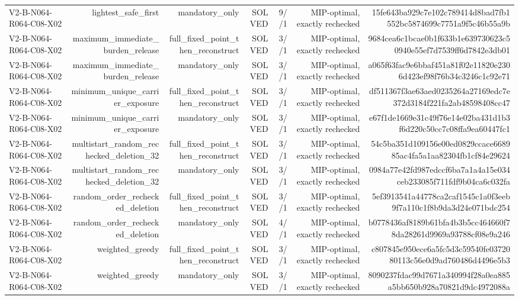 {\begin{longtable}{lrrrrrr}
V2-B-N064-R064-C08-X02 & lightest\_safe\_first & mandatory\_only & SOLVED & 9//1 & MIP-optimal, exactly rechecked & 15fe643ba929c7e102c789414d8bad7fb1552bc5874699c7751a9f5c46b55a9b \\
V2-B-N064-R064-C08-X02 & maximum\_immediate\_burden\_release & full\_fixed\_point\_then\_reconstruct & SOLVED & 3//1 & MIP-optimal, exactly rechecked & 9684cea6c1bcae0b1f633b1e639730623c50940e55ef7d7539ff6d7842e3db01 \\
V2-B-N064-R064-C08-X02 & maximum\_immediate\_burden\_release & mandatory\_only & SOLVED & 3//1 & MIP-optimal, exactly rechecked & a065f63fac9e6bbaf451a81f02e11820e2306d423ef98f76b34c3246c1c92e71 \\
V2-B-N064-R064-C08-X02 & minimum\_unique\_carrier\_exposure & full\_fixed\_point\_then\_reconstruct & SOLVED & 3//1 & MIP-optimal, exactly rechecked & df511367f3ae63aed0235264a27169edc7e372d3184f221fa2ab48598408cc47 \\
V2-B-N064-R064-C08-X02 & minimum\_unique\_carrier\_exposure & mandatory\_only & SOLVED & 3//1 & MIP-optimal, exactly rechecked & e67f1de1669e31c49f76e14e02ba431d1b3f6d220c50cc7c08ffa9ea60447fc1 \\
V2-B-N064-R064-C08-X02 & multistart\_random\_rechecked\_deletion\_32 & full\_fixed\_point\_then\_reconstruct & SOLVED & 3//1 & MIP-optimal, exactly rechecked & 54c5ba351d109156e00ed0829ccace668985ac4fa5a1aa82304fb1cf84e29624 \\
V2-B-N064-R064-C08-X02 & multistart\_random\_rechecked\_deletion\_32 & mandatory\_only & SOLVED & 3//1 & MIP-optimal, exactly rechecked & 0984a77e42fd987edccf6ba7a1a4a15e034ceb233085f711fdf9b04ca6c032fa \\
V2-B-N064-R064-C08-X02 & random\_order\_rechecked\_deletion & full\_fixed\_point\_then\_reconstruct & SOLVED & 3//1 & MIP-optimal, exactly rechecked & 5ef3913541a44778ca2caf1545c1a0f3eeb9f7a110c1f8b9da3d24e071bdc254 \\
V2-B-N064-R064-C08-X02 & random\_order\_rechecked\_deletion & mandatory\_only & SOLVED & 4//1 & MIP-optimal, exactly rechecked & b0778436af8189b61bfa4b3b5cc464660f78da28261d9969a93788cf08e9a246 \\
V2-B-N064-R064-C08-X02 & weighted\_greedy & full\_fixed\_point\_then\_reconstruct & SOLVED & 3//1 & MIP-optimal, exactly rechecked & c807845e950ece6a5fc5d3c59540fe0372080113c56e0d9ad760486d4496e5b3 \\
V2-B-N064-R064-C08-X02 & weighted\_greedy & mandatory\_only & SOLVED & 3//1 & MIP-optimal, exactly rechecked & 8090237fdac99d7671a340994f28a0ea885a5bb650b928a70821d9dc4972088a \\

\end{longtable}}

